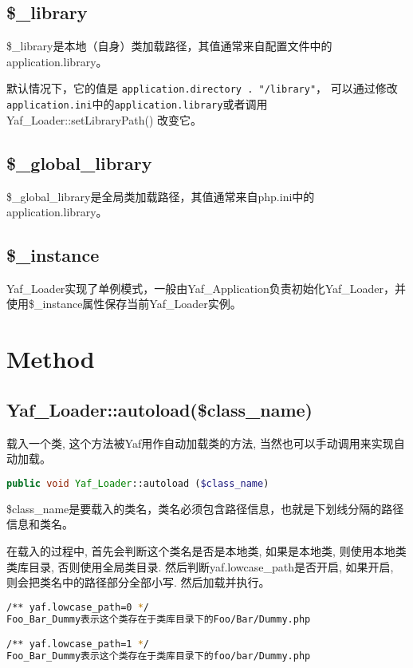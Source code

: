 \subsection{\$\_library}

\$\_library是本地（自身）类加载路径，其值通常来自配置文件中的application.library。

默认情况下，它的值是 \texttt{application.directory . "/library"}， 可以通过修改\texttt{application.ini}中的\texttt{application.library}或者调用 Yaf\_Loader::setLibraryPath() 改变它。

\subsection{\$\_global\_library}

\$\_global\_library是全局类加载路径，其值通常来自php.ini中的application.library。


\subsection{\$\_instance}

Yaf\_Loader实现了单例模式，一般由Yaf\_Application负责初始化Yaf\_Loader，并使用\$\_instance属性保存当前Yaf\_Loader实例。

\section{Method}


\subsection{Yaf\_Loader::autoload(\$class\_name)}

载入一个类, 这个方法被Yaf用作自动加载类的方法, 当然也可以手动调用来实现自动加载。




\begin{lstlisting}[language=PHP]
public void Yaf_Loader::autoload ($class_name)
\end{lstlisting}

\$class\_name是要载入的类名，类名必须包含路径信息，也就是下划线分隔的路径信息和类名。

在载入的过程中, 首先会判断这个类名是否是本地类, 如果是本地类, 则使用本地类类库目录, 否则使用全局类目录. 然后判断yaf.lowcase\_path是否开启, 如果开启, 则会把类名中的路径部分全部小写. 然后加载并执行。

\begin{lstlisting}[language=bash]
/** yaf.lowcase_path=0 */
Foo_Bar_Dummy表示这个类存在于类库目录下的Foo/Bar/Dummy.php

/** yaf.lowcase_path=1 */
Foo_Bar_Dummy表示这个类存在于类库目录下的foo/bar/Dummy.php
\end{lstlisting}


